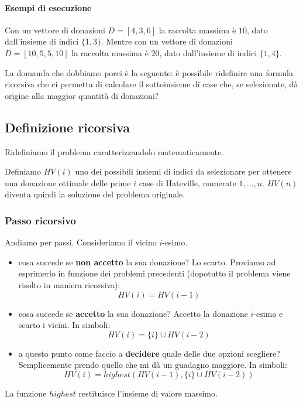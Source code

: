 \paragraph{Esempi di esecuzione}
Con un vettore di donazioni \(D = [4, 3, 6]\) la raccolta massima è \(10\), dato dall'insieme di indici \(\{1, 3\}\).
Mentre con un vettore di donazioni \(D = [10, 5, 5, 10]\) la raccolta massima è \(20\), dato dall'insieme di indici \(\{1, 4\}\).

La domanda che dobbiamo porci è la seguente: è possibile ridefinire una formula ricorsiva che ci permetta di calcolare il sottoinsieme di case che, se selezionate, dà origine alla maggior quantità di donazioni?

\subsection{Definizione ricorsiva}

Ridefiniamo il problema caratterizzandolo matematicamente.

Definiamo \(HV(i)\) uno dei possibili insiemi di indici da selezionare per ottenere una donazione ottimale delle prime \(i\) case di Hateville, numerate \(1, \dots, n\).
\(HV(n)\) diventa quindi la soluzione del problema originale.

\subsubsection{Passo ricorsivo}

Andiamo per passi.
Consideriamo il vicino \(i\)-esimo.
\begin{itemize}
    \item cosa succede se \textbf{non accetto} la sua donazione?
    Lo scarto.
    Proviamo ad esprimerlo in funzione dei problemi precedenti (dopotutto il problema viene risolto in maniera ricorsiva):
    \[HV(i) = HV(i-1)\]

    \item cosa succede se \textbf{accetto} la sua donazione?
    Accetto la donazione \(i\)-esima e scarto i vicini.
    In simboli:
    \[HV(i) = \{i\} \cup HV(i-2)\]

    \item a questo punto come faccio a \textbf{decidere} quale delle due opzioni scegliere?
    Semplicemente prendo quello che mi dà un guadagno maggiore.
    In simboli:
    \[HV(i) = highest(HV(i-1), \{i\} \cup HV(i-2))\]
\end{itemize}
La funzione \(highest\) restituisce l'insieme di valore massimo.

